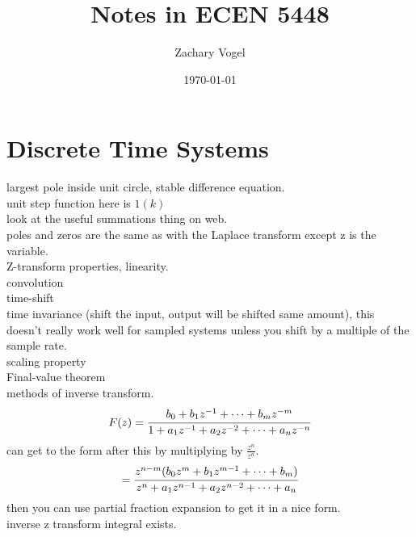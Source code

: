 \documentclass{article}
\author{Zachary Vogel}
\date{\today}
\title{Notes in ECEN 5448}
\begin{document}
\maketitle


\section*{Discrete Time Systems}
largest pole inside unit circle, stable difference equation.\\
unit step function here is $1(k)$\\
look at the useful summations thing on web.\\
poles and zeros are the same as with the Laplace transform except z is the variable.\\

Z-transform properties, linearity.\\
convolution\\
time-shift\\
time invariance (shift the input, output will be shifted same amount), this doesn't really work well for sampled systems unless you shift by a multiple of the sample rate.\\
scaling property\\
Final-value theorem\\
methods of inverse transform.\\
\[F(z)=\cfrac{b_0+b_1z^{-1}+\dots+b_mz^{-m}}{1+a_1z^{-1}+a_2z^{-2}+\dots+a_nz^{-n}}\]
can get to the form after this by multiplying by $\frac{z^n}{z^n}$.\\
\[=\cfrac{z^{n-m}(b_0z^m+b_1z^{m-1}+\dots+b_m)}{z^n+a_1z^{n-1}+a_2z^{n-2}+\dots+a_n}\]
then you can use partial fraction expansion to get it in a nice form.\\
inverse z transform integral exists.\\
\end{document}
